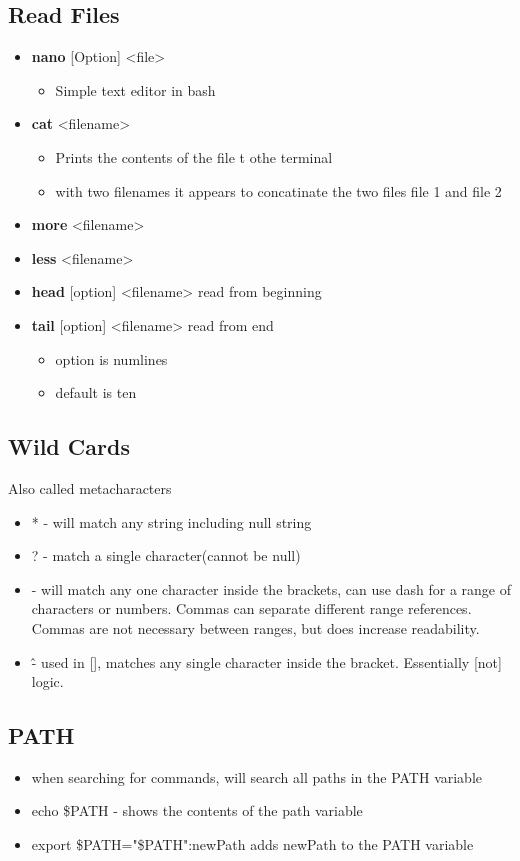 \documentclass{article}
\begin{document}
\subsection*{Read Files}
\begin{itemize}
  \item \textbf{nano} [Option] <file>
  \begin{itemize}
    \item Simple text editor in bash
  \end{itemize}
  \item \textbf{cat} <filename>
  \begin{itemize}
    \item Prints the contents of the file t othe terminal
    \item with two filenames it appears to concatinate the two files file 1 and file 2
  \end{itemize}
  \item \textbf{more} <filename>
  \item \textbf{less} <filename>
  \item \textbf{head} [option] <filename> read from beginning
  \item \textbf{tail} [option] <filename> read from end
  \begin{itemize}
    \item option is numlines
    \item default is ten
  \end{itemize}
  
\end{itemize}
\subsection*{Wild Cards}
Also called metacharacters
\begin{itemize}
  \item * - will match any string including null string
  \item ? - match a single character(cannot be null)
  \item [] - will match any one character inside the brackets, can use dash for a range of characters or numbers. Commas can separate different range references. Commas are not necessary between ranges, but does increase readability.
  \item \^ - used in [], matches any  single character inside the bracket. Essentially [not] logic.
\end{itemize}
\subsection*{PATH}
\begin{itemize}
  \item when searching for commands, will search all paths in the PATH variable
  \item echo \$PATH - shows the contents of the path variable
  \item export \$PATH="\$PATH":newPath adds newPath to the PATH variable
\end{itemize}
\end{document}
